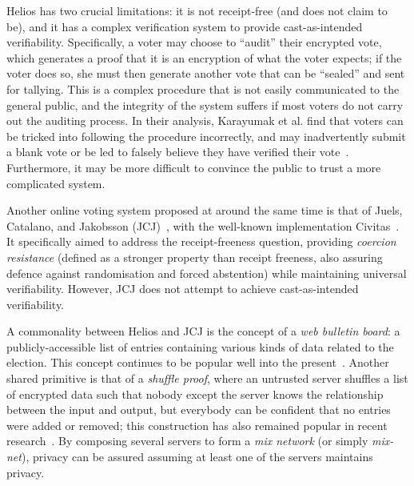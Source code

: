 \documentclass[12pt,a4paper]{article}
\theoremstyle{definition}
\begin{document}
Helios has two crucial limitations: it is not receipt-free (and does not claim to be), and it has a complex verification system to provide cast-as-intended verifiability. Specifically, a voter may choose to ``audit'' their encrypted vote, which generates a proof that it is an encryption of what the voter expects; if the voter does so, she must then generate another vote that can be ``sealed'' and sent for tallying. This is a complex procedure that is not easily communicated to the general public, and the integrity of the system suffers if most voters do not carry out the auditing process. In their analysis, Karayumak et al. find that voters can be tricked into following the procedure incorrectly, and may inadvertently submit a blank vote or be led to falsely believe they have verified their vote~\cite{karayumak2011usability}. Furthermore, it may be more difficult to convince the public to trust a more complicated system.

Another online voting system proposed at around the same time is that of Juels, Catalano, and Jakobsson (JCJ)~\cite{juels2010coercion}, with the well-known implementation Civitas~\cite{clarkson2008civitas}. It specifically aimed to address the receipt-freeness question, providing \textit{coercion resistance} (defined as a stronger property than receipt freeness, also assuring defence against randomisation and forced abstention) while maintaining universal verifiability. However, JCJ does not attempt to achieve cast-as-intended verifiability.

A commonality between Helios and JCJ is the concept of a \textit{web bulletin board}: a publicly-accessible list of entries containing various kinds of data related to the election. This concept continues to be popular well into the present~\cite{kiayias2018security}. Another shared primitive is that of a \textit{shuffle proof}, where an untrusted server shuffles a list of encrypted data such that nobody except the server knows the relationship between the input and output, but everybody can be confident that no entries were added or removed; this construction has also remained popular in recent research~\cite{cortier2017machine}. By composing several servers to form a \textit{mix network} (or simply \textit{mix-net}), privacy can be assured assuming at least one of the servers maintains privacy.
\end{document}
